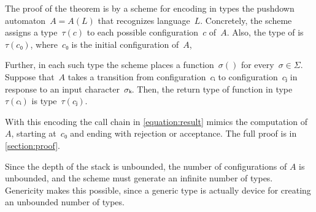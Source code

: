 The proof of the theorem is by a scheme for encoding in \Java types
  the pushdown automaton~$A=A(L)$ that recognizes language~$L$.
Concretely, the scheme assigns a type~$τ(c)$
  to each possible configuration~$c$ of~$A$.
Also, the type of  is~$τ(c₀)$, where~$c₀$ is the initial configuration of~$A$,

Further, in each such type the scheme places
  a function~$σ()$ for every~$σ∈Σ$.
Suppose that~$A$ takes a transition from configuration~$cᵢ$ to configuration~$cⱼ$
  in response to an input character~$σₖ$.
Then, the return type of function  in type~$τ(cᵢ)$ is type~$τ(cⱼ)$.

With this encoding the call chain in \cref{equation:result}
  mimics the computation of~$A$, starting at~$c₀$ and ending with
  rejection or acceptance.
The full proof is in \cref{section:proof}.

Since the depth of the stack is unbounded, the number of configurations of $A$ is unbounded,
  and the scheme must generate an infinite number of types.
Genericity makes this possible, since a generic type is
  actually device for creating an unbounded number of types.

